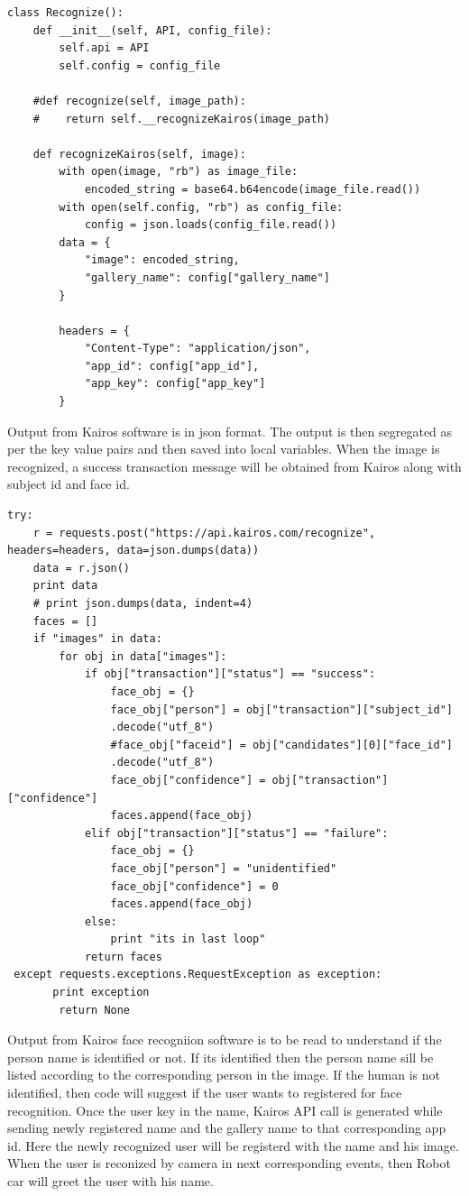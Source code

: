 \documentclass[sigconf]{acmart}
\begin{document}
\begin{lstlisting}
class Recognize():
    def __init__(self, API, config_file):
        self.api = API
        self.config = config_file

    #def recognize(self, image_path):
    #    return self.__recognizeKairos(image_path)
    
    def recognizeKairos(self, image):
        with open(image, "rb") as image_file:
            encoded_string = base64.b64encode(image_file.read())
        with open(self.config, "rb") as config_file:
            config = json.loads(config_file.read())
        data = {
            "image": encoded_string,
            "gallery_name": config["gallery_name"]
        }

        headers = {
            "Content-Type": "application/json",
            "app_id": config["app_id"],
            "app_key": config["app_key"]
        }
\end{lstlisting}

Output from Kairos software is in json format. The output is then segregated as per the key value pairs and then saved into local variables. When the image is recognized, a success transaction message will be obtained from Kairos along with subject id and face id.

\begin{lstlisting}
try:
    r = requests.post("https://api.kairos.com/recognize", headers=headers, data=json.dumps(data))
    data = r.json()
    print data
    # print json.dumps(data, indent=4)
    faces = []
    if "images" in data:
        for obj in data["images"]:
            if obj["transaction"]["status"] == "success":
                face_obj = {}
                face_obj["person"] = obj["transaction"]["subject_id"]
                .decode("utf_8")
                #face_obj["faceid"] = obj["candidates"][0]["face_id"]
                .decode("utf_8")
                face_obj["confidence"] = obj["transaction"]["confidence"]
                faces.append(face_obj)
            elif obj["transaction"]["status"] == "failure":
                face_obj = {}
                face_obj["person"] = "unidentified"
                face_obj["confidence"] = 0
                faces.append(face_obj)
            else:
                print "its in last loop"
            return faces
 except requests.exceptions.RequestException as exception:
       print exception
        return None
\end{lstlisting}    

Output from Kairos face recogniion software is to be read to understand if the person name is identified or not. If its identified then the person name sill be listed according to the corresponding person in the image. If the human is not identified, then code will suggest if the user wants to registered for face recognition. Once the user key in the name, Kairos API call is generated while sending newly registered name and the gallery name to that corresponding app id. Here the newly recognized user will be registerd with the name and his image. When the user is reconized by camera in next corresponding events, then Robot car will greet the user with his name.
\end{document}
